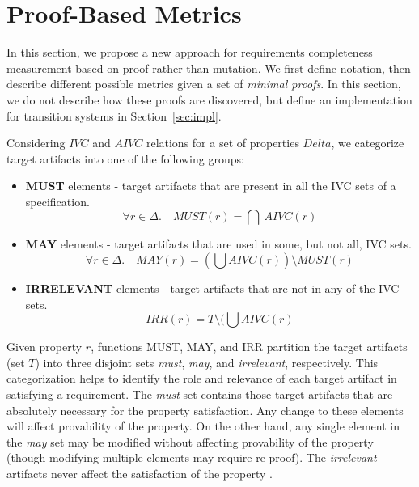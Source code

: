 \newcommand{\minproofcov}{\text{\sc MinProof-Cov}}


\section{Proof-Based Metrics}
\label{sec:method}

In this section, we propose a new approach for       requirements completeness measurement based on proof rather than mutation.  We first define notation, then describe different possible metrics given a set of {\em minimal proofs}.  In this section, we do not describe how these proofs are discovered, but define an implementation for transition systems in Section~\ref{sec:impl}.


Considering $IVC$ and $AIVC$ relations for a set of properties $Delta$, we categorize target artifacts into one of the following groups:

\begin{itemize}
  \item \textbf{MUST} elements - target artifacts that are present in all the IVC sets of a specification.
      \[
      \forall r \in \Delta.\quad MUST (r) = \bigcap \ AIVC(r)
      \]

  \item \textbf{MAY} elements - target artifacts that are used in some, but not all, IVC sets.
      \[
      \forall r \in \Delta .\quad MAY(r) = (\bigcup AIVC (r)) \setminus MUST (r)
      \]

  \item \textbf{IRRELEVANT} elements - target artifacts that are not in any of the IVC sets.
  $$IRR(r) = T \setminus (\bigcup AIVC (r)$$
\end{itemize}

Given property $r$, functions MUST, MAY, and IRR partition the target artifacts (set $T$) into three disjoint sets \emph{must}, \emph{may}, and \emph{irrelevant}, respectively. This categorization helps to identify the role and relevance of each target artifact in satisfying a requirement. The \emph{must} set contains those target artifacts that are absolutely necessary for the property satisfaction.  Any change to these elements will affect provability of the property. On the other hand, any single element in the \emph{may} set may be modified without affecting provability of the property (though modifying multiple elements may require re-proof).   The \emph{irrelevant} artifacts never affect the satisfaction of the property \cite{Murugesan16:renext}.

